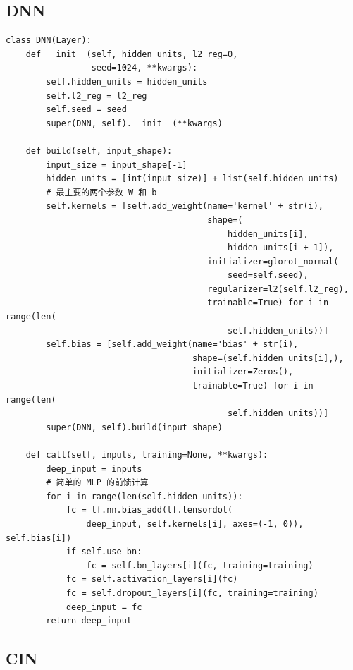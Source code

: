\documentclass[degree=project,degree-type=project,cjk-font=noto]{thuthesis}
\begin{document}
\subsection{DNN}


  \begin{verbatim}
class DNN(Layer):
    def __init__(self, hidden_units, l2_reg=0,
                 seed=1024, **kwargs):
        self.hidden_units = hidden_units
        self.l2_reg = l2_reg
        self.seed = seed
        super(DNN, self).__init__(**kwargs)

    def build(self, input_shape):
        input_size = input_shape[-1]
        hidden_units = [int(input_size)] + list(self.hidden_units)
        # 最主要的两个参数 W 和 b
        self.kernels = [self.add_weight(name='kernel' + str(i),
                                        shape=(
                                            hidden_units[i],
                                            hidden_units[i + 1]),
                                        initializer=glorot_normal(
                                            seed=self.seed),
                                        regularizer=l2(self.l2_reg),
                                        trainable=True) for i in range(len(
                                            self.hidden_units))]
        self.bias = [self.add_weight(name='bias' + str(i),
                                     shape=(self.hidden_units[i],),
                                     initializer=Zeros(),
                                     trainable=True) for i in range(len(
                                            self.hidden_units))]
        super(DNN, self).build(input_shape)

    def call(self, inputs, training=None, **kwargs):
        deep_input = inputs
        # 简单的 MLP 的前馈计算
        for i in range(len(self.hidden_units)):
            fc = tf.nn.bias_add(tf.tensordot(
                deep_input, self.kernels[i], axes=(-1, 0)), self.bias[i])
            if self.use_bn:
                fc = self.bn_layers[i](fc, training=training)
            fc = self.activation_layers[i](fc)
            fc = self.dropout_layers[i](fc, training=training)
            deep_input = fc
        return deep_input
  \end{verbatim}

\subsection{CIN}
\end{document}
